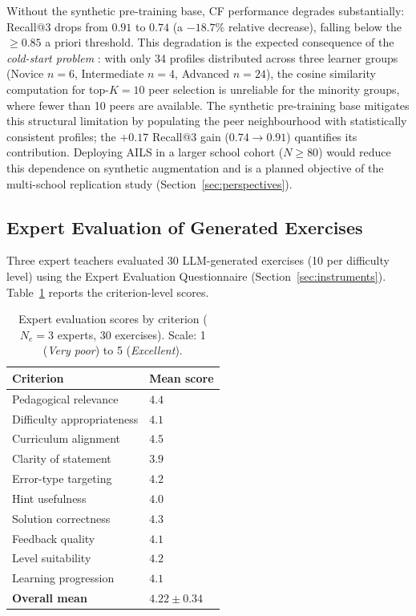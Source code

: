\documentclass[ASNA,twocolumn]{USG} %
\begin{document}
Without the synthetic pre-training base, CF performance degrades
substantially: Recall@3 drops from $0.91$ to $0.74$ (a $-18.7\%$
relative decrease), falling below the $\geq 0.85$ a priori threshold.
This degradation is the expected consequence of the \emph{cold-start
problem} \cite{Khanal2020}: with only 34 profiles distributed across
three learner groups (Novice $n{=}6$, Intermediate $n{=}4$,
Advanced $n{=}24$), the cosine similarity computation for
top-$K{=}10$ peer selection is unreliable for the minority groups,
where fewer than 10 peers are available.
The synthetic pre-training base mitigates this structural limitation
by populating the peer neighbourhood with statistically consistent
profiles; the $+0.17$ Recall@3 gain ($0.74 \to 0.91$) quantifies its
contribution.
Deploying AILS in a larger school cohort ($N \geq 80$) would reduce
this dependence on synthetic augmentation and is a planned objective
of the multi-school replication study (Section~\ref{sec:perspectives}).

\subsection{Expert Evaluation of Generated Exercises}
\label{sec:results_expert}

Three expert teachers evaluated 30 LLM-generated exercises
(10 per difficulty level) using the Expert Evaluation
Questionnaire (Section~\ref{sec:instruments}).
Table~\ref{tab:expert_scores} reports the criterion-level
scores.

\begin{table}[ht]
\caption{Expert evaluation scores by criterion
($N_e{=}3$ experts, 30 exercises).
Scale: 1 (\emph{Very poor}) to 5 (\emph{Excellent}).}
\label{tab:expert_scores}
\begin{tabular*}{\hsize}{@{\extracolsep{\fill}}ll@{}}
\toprule
\textbf{Criterion} & \textbf{Mean score} \\
\midrule
Pedagogical relevance        & $4.4$ \\
Difficulty appropriateness   & $4.1$ \\
Curriculum alignment         & $4.5$ \\
Clarity of statement         & $3.9$ \\
Error-type targeting         & $4.2$ \\
Hint usefulness              & $4.0$ \\
Solution correctness         & $4.3$ \\
Feedback quality             & $4.1$ \\
Level suitability            & $4.2$ \\
Learning progression         & $4.1$ \\
\midrule
\textbf{Overall mean}        & $\mathbf{4.22 \pm 0.34}$ \\
\bottomrule
\end{tabular*}
\end{table}
\end{document}
